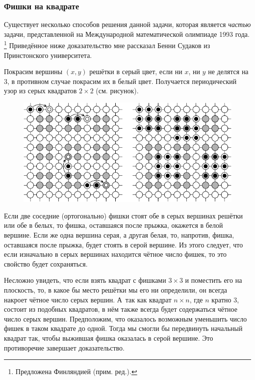 \documentclass[twoside]{book}
\begin{document}
\subsubsection*{Фишки на квадрате}%

Существует несколько способов решения данной задачи, которая является \emph{частью} задачи, представленной на Международной математической олимпиаде 1993 года.%
\footnote{Предложена Финляндией (прим. ред.).}
Приведённое ниже доказательство мне рассказал Бенни Судаков из Принстонского университета.

\medskip

Покрасим вершины $(x, y)$ решётки в серый цвет, если ни $x$, ни $y$ не делятся на $3$, в противном случае покрасим их в белый цвет.
Получается периодический узор из серых квадратов $2\times 2$ (см. рисунок). 

\begin{figure}[ht!]
  \vspace{-\baselineskip}
\centering
\includegraphics{mp/wink-190}
\end{figure}


Если две соседние (ортогонально) фишки стоят обе в серых вершинах решётки или обе в белых, то фишка, оставшаяся после прыжка, окажется в белой вершине.
Если же одна вершина серая, а другая белая, то, напротив, фишка, оставшаяся после прыжка, будет стоять в серой вершине.
Из этого следует, что если изначально в серых вершинах находится чётное число фишек, то это свойство будет сохраняться.

Несложно увидеть, что если взять квадрат с фишками $3\times 3$ и поместить его на плоскость, то, в какое бы место решётки мы его ни определили, он всегда накроет чётное число серых вершин.
А~так как квадрат $n\times n$, где $n$ кратно $3$, состоит из подобных квадратов,  в нём также всегда будет содержаться чётное число серых вершин.
Предположим, что оказалось возможным уменьшить число фишек в таком квадрате до одной.
Тогда мы смогли бы передвинуть начальный квадрат так, чтобы выжившая фишка оказалась в серой вершине. 
Это противоречие завершает доказательство.
\heart
\end{document}
